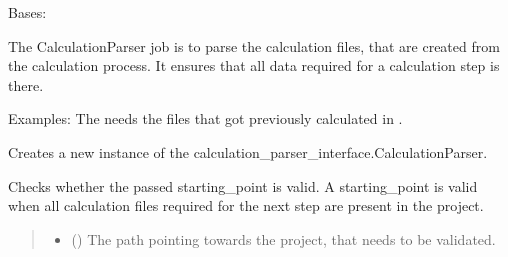 \documentclass[letterpaper,10pt,english]{sphinxmanual}
\begin{document}
\begin{fulllineitems}
\label{\detokenize{apidoc/src.osm_configurator.model.parser:src.osm_configurator.model.parser.calculation_parser.CalculationParser}}
\pysigstartsignatures
{}
\pysigstopsignatures
\sphinxAtStartPar
Bases: {\hyperref[\detokenize{apidoc/src.osm_configurator.model.parser:src.osm_configurator.model.parser.calculation_parser_interface.CalculationParserInterface}]{}}

\sphinxAtStartPar
The CalculationParser job is to parse the calculation files, that are created from the calculation process.
It ensures that all data required for a calculation step is there.

\sphinxAtStartPar
Examples: The  needs the
files that got previously calculated in .

\begin{fulllineitems}
\label{\detokenize{apidoc/src.osm_configurator.model.parser:src.osm_configurator.model.parser.calculation_parser.CalculationParser.__init__}}
\pysigstartsignatures
{}
\pysigstopsignatures
\sphinxAtStartPar
Creates a new instance of the calculation\_parser\_interface.CalculationParser.

\end{fulllineitems}


\begin{fulllineitems}
\label{\detokenize{apidoc/src.osm_configurator.model.parser:src.osm_configurator.model.parser.calculation_parser.CalculationParser.check_validity_of_calculation_step}}
\pysigstartsignatures
{}
\pysigstopsignatures
\sphinxAtStartPar
Checks whether the passed starting\_point is valid.
A starting\_point is valid when all calculation files required for the next step are present in the project.
\begin{quote}\begin{description}
\begin{itemize}
\item {} 
\sphinxAtStartPar
{} () \textendash{} The path pointing towards the project, that needs to be validated.


\end{itemize}
\end{description}
\end{quote}
\end{fulllineitems}
\end{fulllineitems}
\end{document}
